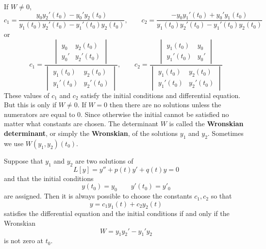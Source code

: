     If $W \neq 0$,
    \begin{equation*}
        c_1 = \frac{y_0y_2'(t_0) - y_0'y_2(t_0)}{y_1(t_0)y_2'(t_0) - y_1'(t_0)y_2(t_0)}, \qquad c_2 = \frac{-y_0y_1'(t_0) + y_0'y_1(t_0)}{y_1(t_0)y_2'(t_0) - y_1'(t_0)y_2(t_0)}
    \end{equation*}
    or 
    \begin{equation*}
        c_1 = \frac{
            \begin{vmatrix}
                y_0 & y_2(t_0) \\
                y_0' & y_2'(t_0)
            \end{vmatrix}
        }{
            \begin{vmatrix}
                y_1(t_0) & y_2(t_0) \\
                y_1'(t_0) & y_2'(t_0)
            \end{vmatrix}
        }, \qquad 
        c_2 = \frac{
            \begin{vmatrix}
                y_1(t_0) & y_0 \\
                y_1'(t_0) & y_0'
            \end{vmatrix}
        }{
            \begin{vmatrix}
                y_1(t_0) & y_2(t_0) \\
                y_1'(t_0) & y_2'(t_0)
            \end{vmatrix}
        }
    \end{equation*}
    These values of $c_1$ and $c_2$ satisfy the initial conditions and differential equation. But this is only if $W \neq 0$. If $W = 0$ then there are no solutions unless the numerators are equal to 0. Since otherwise the initial cannot be satisfied no matter what constants are chosen.
    \newline \indent
    The determinant $W$ is called the \textbf{Wronskian determinant}, or simply the \textbf{Wronskian}, of the solutions $y_1$ and $y_2$. Sometimes we use $W(y_1, y_2)(t_0)$.
    \begin{theorem}
        Suppose that $y_1$ and $y_2$ are two solutions of
        \begin{equation*}
            L[y] = y'' + p(t)y' + q(t)y = 0
        \end{equation*}
        and that the initial conditions
        \begin{equation*}
            y(t_0) = y_0 \qquad y'(t_0) = y'_0
        \end{equation*}
        are assigned. Then it is always possible to choose the constants $c_1, c_2$ so that 
        \begin{equation*}
            y = c_1y_1(t) + c_2y_2(t)
        \end{equation*}
        satisfies the differential equation and the initial conditions if and only if the Wronskian
        \begin{equation*}
            W = y_1y_2' - y_1'y_2
        \end{equation*}
        is not zero at $t_0$.
    \end{theorem}
    